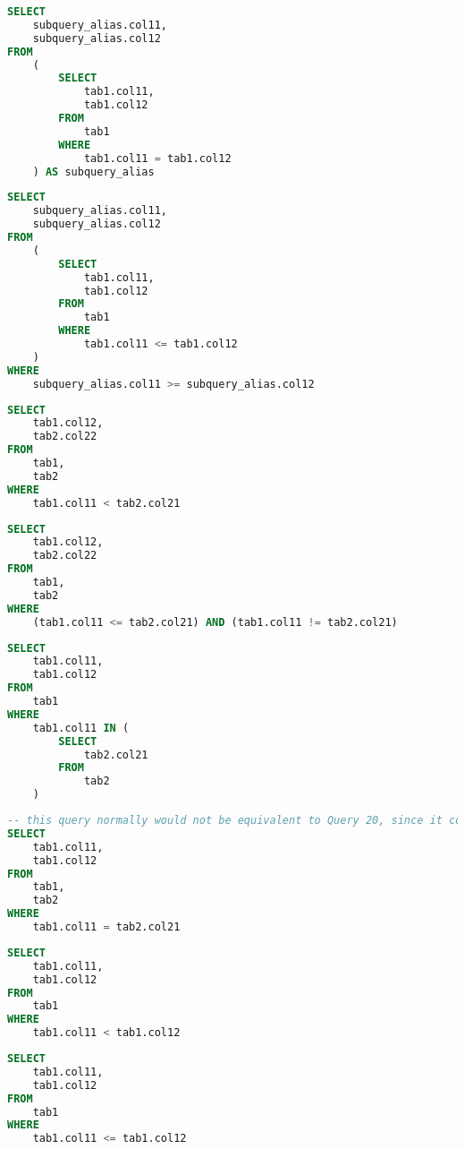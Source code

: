 \documentclass[magisterska,en]{pracamgr}
\begin{document}
\begin{lstlisting}[language=SQL, caption=Query 16]
SELECT
    subquery_alias.col11,
    subquery_alias.col12
FROM
    (
        SELECT
            tab1.col11,
            tab1.col12
        FROM
            tab1
        WHERE
            tab1.col11 = tab1.col12
    ) AS subquery_alias
\end{lstlisting}

\begin{lstlisting}[language=SQL, caption=Query 17]
SELECT
    subquery_alias.col11,
    subquery_alias.col12
FROM
    (
        SELECT
            tab1.col11,
            tab1.col12
        FROM
            tab1
        WHERE
            tab1.col11 <= tab1.col12
    )
WHERE
    subquery_alias.col11 >= subquery_alias.col12
\end{lstlisting}

\begin{lstlisting}[language=SQL, caption=Query 18]
SELECT 
    tab1.col12,
    tab2.col22
FROM
    tab1,
    tab2
WHERE
    tab1.col11 < tab2.col21
\end{lstlisting}

\begin{lstlisting}[language=SQL, caption=Query 19]
SELECT 
    tab1.col12,
    tab2.col22
FROM
    tab1,
    tab2
WHERE
    (tab1.col11 <= tab2.col21) AND (tab1.col11 != tab2.col21)
\end{lstlisting}

\begin{lstlisting}[language=SQL, caption=Query 20]
SELECT
    tab1.col11,
    tab1.col12
FROM
    tab1
WHERE
    tab1.col11 IN (
        SELECT
            tab2.col21
        FROM
            tab2
    )
\end{lstlisting}

\begin{lstlisting}[language=SQL, caption=Query 21]
-- this query normally would not be equivalent to Query 20, since it could return duplicated values
SELECT
    tab1.col11,
    tab1.col12
FROM
    tab1,
    tab2
WHERE
    tab1.col11 = tab2.col21
\end{lstlisting}

\begin{lstlisting}[language=SQL, caption=Query 22]
SELECT
    tab1.col11,
    tab1.col12
FROM
    tab1
WHERE
    tab1.col11 < tab1.col12
\end{lstlisting}

\begin{lstlisting}[language=SQL, caption=Query 23]
SELECT
    tab1.col11,
    tab1.col12
FROM
    tab1
WHERE
    tab1.col11 <= tab1.col12
\end{lstlisting}
\end{document}
